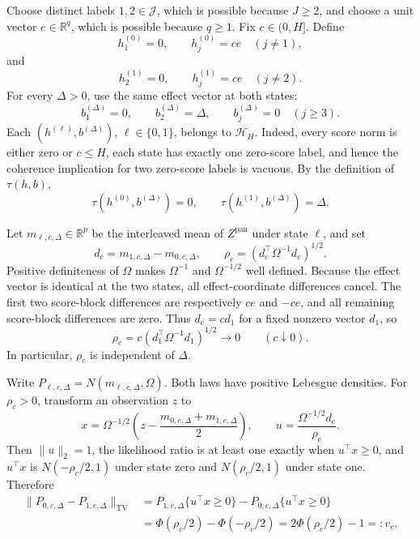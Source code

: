 Choose distinct labels \(1,2\in\mathcal J\), which is possible because \(J\geq2\), and choose a unit vector \(e\in\mathbb R^q\), which is possible because \(q\geq1\). Fix \(c\in(0,H]\). Define
\[
 h^{(0)}_1=0,\qquad h^{(0)}_j=ce\quad(j\ne1),
\]
and
\[
 h^{(1)}_2=0,\qquad h^{(1)}_j=ce\quad(j\ne2).
\]
For every \(\Delta>0\), use the same effect vector at both states:
\[
 b^{(\Delta)}_1=0,\qquad b^{(\Delta)}_2=\Delta,
 \qquad b^{(\Delta)}_j=0\quad(j\geq3).
\]
Each \((h^{(\ell)},b^{(\Delta)})\), \(\ell\in\{0,1\}\), belongs to \(\mathcal H_H\). Indeed, every score norm is either zero or \(c\leq H\), each state has exactly one zero-score label, and hence the coherence implication for two zero-score labels is vacuous. By the definition of \(\tau(h,b)\),
\[
 \tau(h^{(0)},b^{(\Delta)})=0,
 \qquad
 \tau(h^{(1)},b^{(\Delta)})=\Delta.
 \tag{1}
\]

Let \(m_{\ell,c,\Delta}\in\mathbb R^p\) be the interleaved mean of \(Z^{\mathrm{pan}}\) under state \(\ell\), and set
\[
 d_c=m_{1,c,\Delta}-m_{0,c,\Delta},
 \qquad
 \rho_c=(d_c^{\top}\Omega^{-1}d_c)^{1/2}.
 \tag{2}
\]
Positive definiteness of \(\Omega\) makes \(\Omega^{-1}\) and \(\Omega^{-1/2}\) well defined. Because the effect vector is identical at the two states, all effect-coordinate differences cancel. The first two score-block differences are respectively \(ce\) and \(-ce\), and all remaining score-block differences are zero. Thus \(d_c=cd_1\) for a fixed nonzero vector \(d_1\), so
\[
 \rho_c=c(d_1^{\top}\Omega^{-1}d_1)^{1/2}\longrightarrow0
 \qquad(c\downarrow0).
 \tag{3}
\]
In particular, \(\rho_c\) is independent of \(\Delta\).

Write \(P_{\ell,c,\Delta}=N(m_{\ell,c,\Delta},\Omega)\). Both laws have positive Lebesgue densities. For \(\rho_c>0\), transform an observation \(z\) to
\[
 x=\Omega^{-1/2}\left(z-\frac{m_{0,c,\Delta}+m_{1,c,\Delta}}2\right),
 \qquad
 u=\frac{\Omega^{-1/2}d_c}{\rho_c}.
\]
Then \(\lVert u\rVert_2=1\), the likelihood ratio is at least one exactly when \(u^{\top}x\geq0\), and \(u^{\top}x\) is \(N(-\rho_c/2,1)\) under state zero and \(N(\rho_c/2,1)\) under state one. Therefore
\[
\begin{aligned}
 \lVert P_{0,c,\Delta}-P_{1,c,\Delta}\rVert_{\mathrm{TV}}
 &=P_{1,c,\Delta}\{u^{\top}x\geq0\}
   -P_{0,c,\Delta}\{u^{\top}x\geq0\}\\
 &=\Phi(\rho_c/2)-\Phi(-\rho_c/2)
 =2\Phi(\rho_c/2)-1
 =:v_c.
\end{aligned}
\tag{4}
\]

